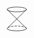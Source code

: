 \documentclass[11pt,a4paper]{scrartcl}
\newcommand{\apo}{%
  \mathrel{%
    \tikz[baseline=(current bounding box.center),scale=.3]{
    \def\x{1}
    \def\y{2}
    \def\r{1.5}
    \draw (0,0) -- (\x,0);
    \draw (0,0) -- (\r*\x,\y);
    \draw (.5*\x,0) -- (\r*\x,\y);
    \draw (\x,0) -- (\r*\x,\y);
    }
  }%
}%
\newcommand{\lcone}{%
  \mathrel{%
    \tikz[baseline=(current bounding box.center),scale=.3]{
    \coordinate (a) at (-1,-1);
    \coordinate (b) at (1,-1);
    \coordinate (c) at (1,1);
    \coordinate (d) at (-1,1);
    \draw (a) -- (c);
    \draw (b) -- (d);
    \draw[dash pattern=on 2pt off 1pt] (b) arc [start angle=0, end angle=180, x radius=1, y radius=0.25];
    \draw (a) arc [start angle=180, end angle=360, x radius=1, y radius=0.25];
    \draw (c) arc [start angle=0, end angle=360, x radius=1, y radius=0.25];
    }
  }%
}%
\DeclareMathOperator{\range}{range}
\DeclareMathOperator{\nspace}{null}
\newcommand{\RR}{\mathbb{R}}
\newcounter{problem}
\begin{document}
\[
\lcone    
\]
%
\end{document}
